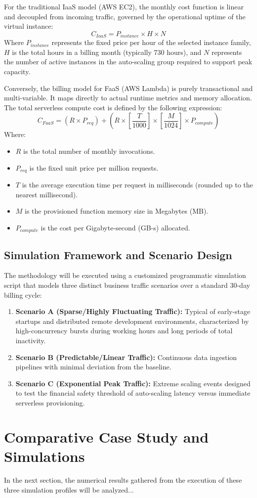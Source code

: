 \documentclass[conference]{IEEEtran}
\begin{document}
For the traditional IaaS model (AWS EC2), the monthly cost function is linear and decoupled from incoming traffic, governed by the operational uptime of the virtual instance:
\begin{equation}
    C_{IaaS} = P_{instance} \times H \times N
\end{equation}
Where $P_{instance}$ represents the fixed price per hour of the selected instance family, $H$ is the total hours in a billing month (typically 730 hours), and $N$ represents the number of active instances in the auto-scaling group required to support peak capacity.

Conversely, the billing model for FaaS (AWS Lambda) is purely transactional and multi-variable. It maps directly to actual runtime metrics and memory allocation. The total serverless compute cost is defined by the following expression:
\begin{equation}
    C_{FaaS} = (R \times P_{req}) + \left( R \times \left[ \frac{T}{1000} \right] \times \left[ \frac{M}{1024} \right] \times P_{compute} \right)
\end{equation}
Where:
\begin{itemize}
    \item $R$ is the total number of monthly invocations.
    \item $P_{req}$ is the fixed unit price per million requests.
    \item $T$ is the average execution time per request in milliseconds (rounded up to the nearest millisecond).
    \item $M$ is the provisioned function memory size in Megabytes (MB).
    \item $P_{compute}$ is the cost per Gigabyte-second (GB-s) allocated.
\end{itemize}

\subsection{Simulation Framework and Scenario Design}
The methodology will be executed using a customized programmatic simulation script that models three distinct business traffic scenarios over a standard 30-day billing cycle:
\begin{enumerate}
    \item \textbf{Scenario A (Sparse/Highly Fluctuating Traffic):} Typical of early-stage startups and distributed remote development environments, characterized by high-concurrency bursts during working hours and long periods of total inactivity.
    \item \textbf{Scenario B (Predictable/Linear Traffic):} Continuous data ingestion pipelines with minimal deviation from the baseline.
    \item \textbf{Scenario C (Exponential Peak Traffic):} Extreme scaling events designed to test the financial safety threshold of auto-scaling latency versus immediate serverless provisioning.
\end{enumerate}

\section{Comparative Case Study and Simulations}
In the next section, the numerical results gathered from the execution of these three simulation profiles will be analyzed...



\end{document}
